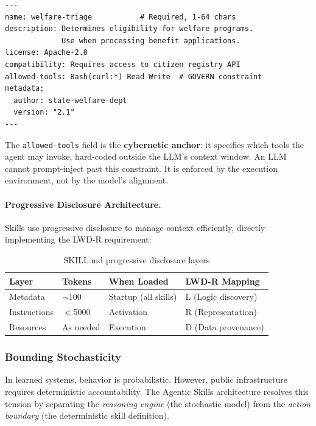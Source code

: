 \documentclass[11pt,a4paper]{article}
\theoremstyle{definition}
\begin{document}
\begin{verbatim}
---
name: welfare-triage           # Required, 1-64 chars
description: Determines eligibility for welfare programs.
             Use when processing benefit applications.
license: Apache-2.0
compatibility: Requires access to citizen registry API
allowed-tools: Bash(curl:*) Read Write  # GOVERN constraint
metadata:
  author: state-welfare-dept
  version: "2.1"
---
\end{verbatim}

The \texttt{allowed-tools} field is the \textbf{cybernetic anchor}: it specifies which tools the agent may invoke, hard-coded outside the LLM's context window. An LLM cannot prompt-inject past this constraint. It is enforced by the execution environment, not by the model's alignment.

\paragraph{Progressive Disclosure Architecture.} Skills use progressive disclosure to manage context efficiently, directly implementing the LWD-R requirement:

\begin{table}[htbp]
\centering
\small
\caption{SKILL.md progressive disclosure layers}
\label{tab:skill-disclosure}
\begin{tabular}{@{}llll@{}}
\toprule
\textbf{Layer} & \textbf{Tokens} & \textbf{When Loaded} & \textbf{LWD-R Mapping} \\
\midrule
Metadata & $\sim$100 & Startup (all skills) & L (Logic discovery) \\
Instructions & $<$5000 & Activation & R (Representation) \\
Resources & As needed & Execution & D (Data provenance) \\
\bottomrule
\end{tabular}
\end{table}

\subsubsection{Bounding Stochasticity}

In learned systems, behavior is probabilistic. However, public infrastructure requires deterministic accountability. The Agentic Skills architecture resolves this tension by separating the \textit{reasoning engine} (the stochastic model) from the \textit{action boundary} (the deterministic skill definition).
\end{document}
